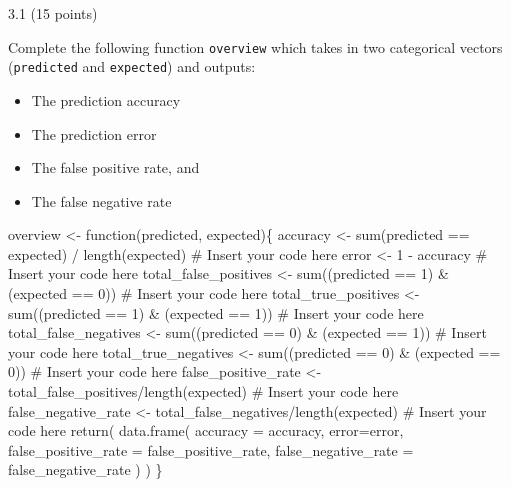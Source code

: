 \documentclass[
  letterpaper,
  DIV=11,
  numbers=noendperiod]{scrartcl}
\newenvironment{Shaded}{\begin{snugshade}}{\end{snugshade}}
\newcommand{\AttributeTok}[1]{\textcolor[rgb]{0.40,0.45,0.13}{#1}}
\newcommand{\CommentTok}[1]{\textcolor[rgb]{0.37,0.37,0.37}{#1}}
\newcommand{\ControlFlowTok}[1]{\textcolor[rgb]{0.00,0.23,0.31}{#1}}
\newcommand{\DecValTok}[1]{\textcolor[rgb]{0.68,0.00,0.00}{#1}}
\newcommand{\FunctionTok}[1]{\textcolor[rgb]{0.28,0.35,0.67}{#1}}
\newcommand{\NormalTok}[1]{\textcolor[rgb]{0.00,0.23,0.31}{#1}}
\newcommand{\OtherTok}[1]{\textcolor[rgb]{0.00,0.23,0.31}{#1}}
\newcommand{\SpecialCharTok}[1]{\textcolor[rgb]{0.37,0.37,0.37}{#1}}
\providecommand{\tightlist}{%
  \setlength{\itemsep}{0pt}\setlength{\parskip}{0pt}}\usepackage{longtable,booktabs,array}
\begin{document}
3.1 (15 points)

Complete the following function \texttt{overview} which takes in two
categorical vectors (\texttt{predicted} and \texttt{expected}) and
outputs:

\begin{itemize}
\tightlist
\item
  The prediction accuracy
\item
  The prediction error
\item
  The false positive rate, and
\item
  The false negative rate
\end{itemize}

\begin{Shaded}
\begin{Highlighting}[]
\NormalTok{overview }\OtherTok{\textless{}{-}} \ControlFlowTok{function}\NormalTok{(predicted, expected)\{}
\NormalTok{    accuracy }\OtherTok{\textless{}{-}} \FunctionTok{sum}\NormalTok{(predicted }\SpecialCharTok{==}\NormalTok{ expected) }\SpecialCharTok{/} \FunctionTok{length}\NormalTok{(expected) }\CommentTok{\# Insert your code here}
\NormalTok{    error }\OtherTok{\textless{}{-}} \DecValTok{1} \SpecialCharTok{{-}}\NormalTok{ accuracy }\CommentTok{\# Insert your code here}
\NormalTok{    total\_false\_positives }\OtherTok{\textless{}{-}} \FunctionTok{sum}\NormalTok{((predicted }\SpecialCharTok{==} \DecValTok{1}\NormalTok{) }\SpecialCharTok{\&}\NormalTok{ (expected }\SpecialCharTok{==} \DecValTok{0}\NormalTok{)) }\CommentTok{\# Insert your code here}
\NormalTok{    total\_true\_positives }\OtherTok{\textless{}{-}} \FunctionTok{sum}\NormalTok{((predicted }\SpecialCharTok{==} \DecValTok{1}\NormalTok{) }\SpecialCharTok{\&}\NormalTok{ (expected }\SpecialCharTok{==} \DecValTok{1}\NormalTok{)) }\CommentTok{\# Insert your code here}
\NormalTok{    total\_false\_negatives }\OtherTok{\textless{}{-}} \FunctionTok{sum}\NormalTok{((predicted }\SpecialCharTok{==} \DecValTok{0}\NormalTok{) }\SpecialCharTok{\&}\NormalTok{ (expected }\SpecialCharTok{==} \DecValTok{1}\NormalTok{)) }\CommentTok{\# Insert your code here}
\NormalTok{    total\_true\_negatives }\OtherTok{\textless{}{-}} \FunctionTok{sum}\NormalTok{((predicted }\SpecialCharTok{==} \DecValTok{0}\NormalTok{) }\SpecialCharTok{\&}\NormalTok{ (expected }\SpecialCharTok{==} \DecValTok{0}\NormalTok{)) }\CommentTok{\# Insert your code here}
\NormalTok{    false\_positive\_rate }\OtherTok{\textless{}{-}}\NormalTok{ total\_false\_positives}\SpecialCharTok{/}\FunctionTok{length}\NormalTok{(expected) }\CommentTok{\# Insert your code here}
\NormalTok{    false\_negative\_rate }\OtherTok{\textless{}{-}}\NormalTok{ total\_false\_negatives}\SpecialCharTok{/}\FunctionTok{length}\NormalTok{(expected) }\CommentTok{\# Insert your code here}
    \FunctionTok{return}\NormalTok{(}
        \FunctionTok{data.frame}\NormalTok{(}
            \AttributeTok{accuracy =}\NormalTok{ accuracy, }
            \AttributeTok{error=}\NormalTok{error, }
            \AttributeTok{false\_positive\_rate =}\NormalTok{ false\_positive\_rate, }
            \AttributeTok{false\_negative\_rate =}\NormalTok{ false\_negative\_rate}
\NormalTok{        )}
\NormalTok{    )}
\NormalTok{\}}
\end{Highlighting}
\end{Shaded}
\end{document}
